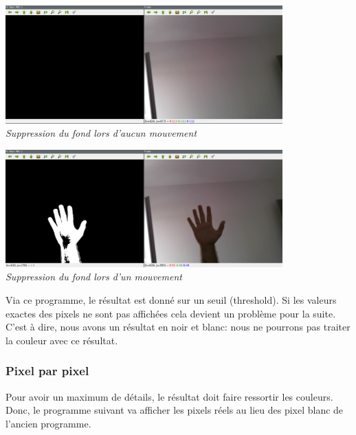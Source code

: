 \documentclass[12pt, french]{report}
\begin{document}
    \begin{center}
        \includegraphics[width=0.8\textwidth]{Images/BGSub/BGSub0.png}\\
        \textit{Suppression du fond lors d'aucun mouvement}
    \end{center}
    
    \begin{center}
        \includegraphics[width=0.8\textwidth]{Images/BGSub/BGSub1.png}\\
        \textit{Suppression du fond lors d'un mouvement}\\
    \end{center}    
    
    Via ce programme, le résultat est donné sur un seuil (threshold). Si les valeurs exactes des pixels ne sont pas affichées cela devient un problème pour la suite. C'est à dire, nous avons un résultat en noir et blanc: nous ne pourrons pas traiter la couleur avec ce résultat.
    
    \subsubsection{Pixel par pixel}
    Pour avoir un maximum de détails, le résultat doit faire ressortir les couleurs. Donc, le programme suivant va afficher les pixels réels au lieu des pixel blanc de l'ancien programme.
    
\end{document}
